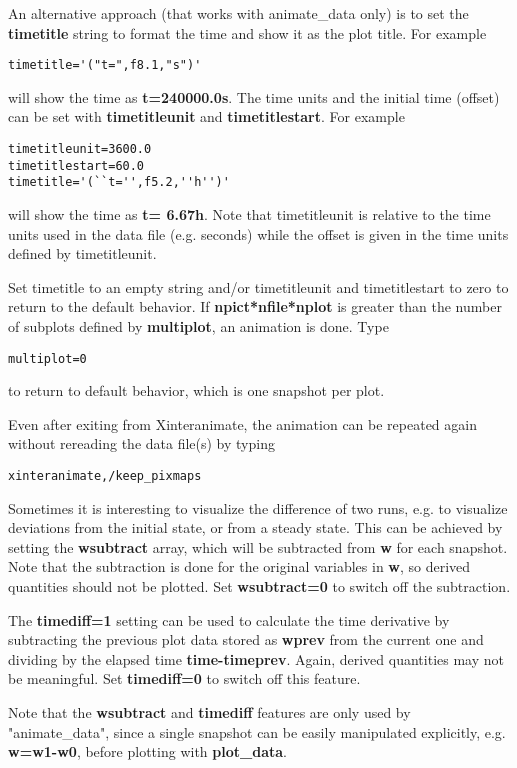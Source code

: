 \documentclass{article}
\begin{document}
An alternative approach (that works with animate\_data only) is to set the 
{\bf timetitle} string to format the time and show it as the plot title.
For example
\begin{verbatim}
timetitle='("t=",f8.1,"s")'
\end{verbatim}
will show the time as {\bf t=240000.0s}. The time units and the
initial time (offset) can be set with {\bf timetitleunit} 
and {\bf timetitlestart}. For example
\begin{verbatim}
timetitleunit=3600.0
timetitlestart=60.0
timetitle='(``t='',f5.2,''h'')'
\end{verbatim}
   will show the time as {\bf t= 6.67h}. Note that timetitleunit is
   relative to the time units used in the data file (e.g. seconds)
   while the offset is given in the time units defined by timetitleunit.

   Set timetitle to an empty string and/or timetitleunit and timetitlestart
   to zero to return to the default behavior. 
   If {\bf npict*nfile*nplot} is greater than the number 
   of subplots defined by {\bf multiplot}, an animation is done. 
   Type 
\begin{verbatim}
multiplot=0
\end{verbatim}
   to return to default behavior, which is one snapshot per plot.

   Even after exiting from Xinteranimate, the animation can be repeated
   again without rereading the data file(s) by typing
\begin{verbatim}
xinteranimate,/keep_pixmaps
\end{verbatim}
   Sometimes it is interesting to visualize the difference of two runs, e.g.
   to visualize deviations from the initial state, or from a steady state.
   This can be achieved by setting the {\bf wsubtract} array, which will be 
   subtracted from {\bf w} for each snapshot. Note that the subtraction is
   done for the original variables in {\bf w}, 
   so derived quantities should not be plotted. 
   Set {\bf wsubtract=0} to switch off the subtraction.
 
   The {\bf timediff=1} setting can be used to calculate the time
   derivative by subtracting the previous plot data stored as {\bf wprev}
   from the current one and dividing by the elapsed time {\bf time-timeprev}. 
   Again, derived quantities may not be meaningful.
   Set {\bf timediff=0} to switch off this feature.

   Note that the {\bf wsubtract} and {\bf timediff} features are only 
   used by "animate\_data", since a single snapshot can be easily 
   manipulated explicitly, e.g. {\bf w=w1-w0}, before plotting with
   {\bf plot\_data}. 
\end{document}
